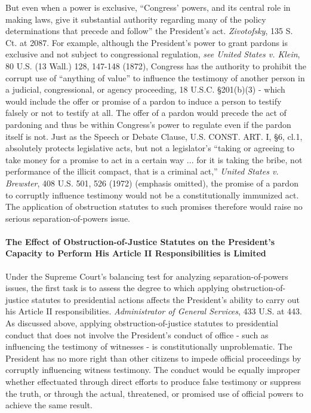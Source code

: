 But even when a power is exclusive, “Congress’ powers, and its central role in making laws, give it substantial authority regarding many of the policy determinations that precede and follow” the President’s act.
\textit{Zivotofsky}, 135 S. Ct. at 2087.
For example, although the President’s power to grant pardons is exclusive and not subject to congressional regulation, \textit{see United States v. Klein}, 80 U.S. (13 Wall.) 128, 147-148 (1872), Congress has the authority to prohibit the corrupt use of “anything of value” to influence the testimony of another person in a judicial, congressional, or agency proceeding, 18 U.S.C. \S 201(b)(3) - which would include the offer or promise of a pardon to induce a person to testify falsely or not to testify at all.
The offer of a pardon would precede the act of pardoning and thus be within Congress’s power to regulate even if the pardon itself is not.
Just as the Speech or Debate Clause, U.S. CONST. ART. I, \S 6, cl.1, absolutely protects legislative acts, but not a legislator’s “taking or agreeing to take money for a promise to act in a certain way ... for it is taking the bribe, not performance of the illicit compact, that is a criminal act,” \textit{United States v. Brewster}, 408 U.S. 501, 526 (1972) (emphasis omitted), the promise of a pardon to corruptly influence testimony would not be a constitutionally immunized act.
The application of obstruction statutes to such promises therefore would raise no serious separation-of-powers issue.

\paragraph{The Effect of Obstruction-of-Justice Statutes on the President’s Capacity to Perform His Article II Responsibilities is Limited}

Under the Supreme Court’s balancing test for analyzing separation-of-powers issues, the first task is to assess the degree to which applying obstruction-of-justice statutes to presidential actions affects the President’s ability to carry out his Article II responsibilities.
\textit{Administrator of General Services}, 433 U.S. at 443.
As discussed above, applying obstruction-of-justice statutes to presidential conduct that does not involve the President’s conduct of office - such as influencing the testimony of witnesses - is constitutionally unproblematic.
The President has no more right than other citizens to impede official proceedings by corruptly influencing witness testimony.
The conduct would be equally improper whether effectuated through direct efforts to produce false testimony or suppress the truth, or through the actual, threatened, or promised use of official powers to achieve the same result.

